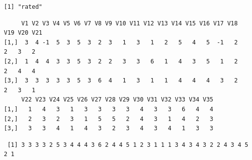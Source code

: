 \documentclass[
  a4paper,
]{ltjsbook}
\newenvironment{Shaded}{\begin{snugshade}}{\end{snugshade}}
\newcommand{\DecValTok}[1]{\textcolor[rgb]{0.68,0.00,0.00}{#1}}
\newcommand{\FunctionTok}[1]{\textcolor[rgb]{0.28,0.35,0.67}{#1}}
\newcommand{\NormalTok}[1]{\textcolor[rgb]{0.00,0.23,0.31}{#1}}
\newcommand{\OtherTok}[1]{\textcolor[rgb]{0.00,0.23,0.31}{#1}}
\newcommand{\SpecialCharTok}[1]{\textcolor[rgb]{0.37,0.37,0.37}{#1}}
\begin{document}
\begin{Shaded}
\end{Shaded}

\begin{verbatim}
[1] "rated"
\end{verbatim}

\begin{Shaded}
\end{Shaded}

\begin{verbatim}
     V1 V2 V3 V4 V5 V6 V7 V8 V9 V10 V11 V12 V13 V14 V15 V16 V17 V18 V19 V20 V21
[1,]  3  4 -1  5  3  5  3  2  3   1   3   1   2   5   4   5  -1   2   2   3   2
[2,]  1  4  4  3  3  5  3  2  2   3   3   6   1   4   3   5   1   2   2   4   4
[3,]  3  3  3  3  3  5  3  6  4   1   3   1   1   4   4   4   3   2   2   3   1
     V22 V23 V24 V25 V26 V27 V28 V29 V30 V31 V32 V33 V34 V35
[1,]   1   4   3   1   3   3   3   3   4   3   3   6   4   4
[2,]   2   3   2   3   1   5   5   2   4   3   1   4   2   3
[3,]   3   3   4   1   4   3   2   3   4   3   4   1   3   3
\end{verbatim}

\begin{Shaded}
\end{Shaded}

\begin{verbatim}
 [1] 3 3 3 3 2 5 3 4 4 4 3 6 2 4 4 5 1 2 3 1 1 1 3 4 3 4 3 2 2 4 3 4 5 2 1
\end{verbatim}

\begin{Shaded}
\end{Shaded}
\end{document}
